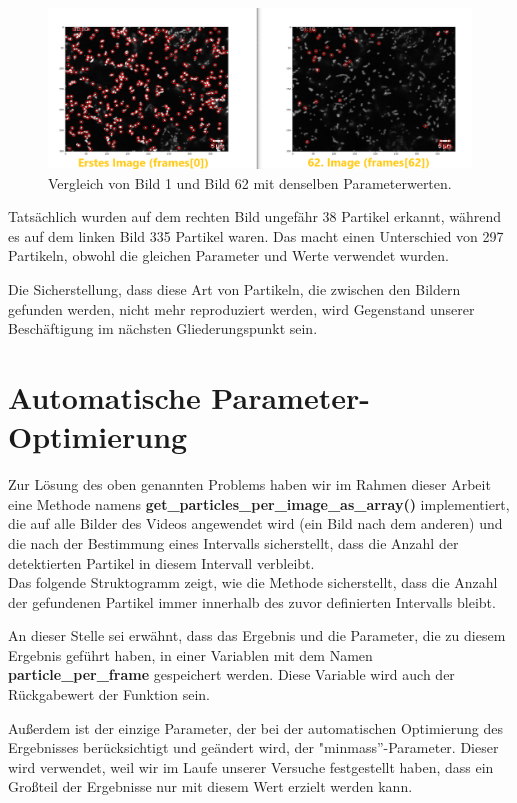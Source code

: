 \begin{figure}[H]
    \centering
    \includegraphics[scale=0.37]{Grafiken/trackpyBilder/comparison_0_Vs_62.png}
    \caption{Vergleich von Bild 1 und Bild 62 mit denselben Parameterwerten.}
    \label{fig:kap3_comp_Bild_1vs_62}
\end{figure}

Tatsächlich wurden auf dem rechten Bild ungefähr 38 Partikel erkannt, während es auf dem linken Bild 335 Partikel waren. Das macht einen Unterschied von 297 Partikeln, obwohl die gleichen Parameter und Werte verwendet wurden.

Die Sicherstellung, dass diese Art von Partikeln, die zwischen den Bildern gefunden werden, nicht mehr reproduziert werden, wird Gegenstand unserer Beschäftigung im nächsten Gliederungspunkt sein.

\section{Automatische Parameter-Optimierung}
Zur Lösung des oben genannten Problems haben wir im Rahmen dieser Arbeit eine Methode namens \textbf{get\_particles\_per\_image\_as\_array()} implementiert, die auf alle Bilder des Videos angewendet wird (ein Bild nach dem anderen) und die nach der Bestimmung eines Intervalls sicherstellt, dass die Anzahl der detektierten Partikel in diesem Intervall verbleibt.\\

Das folgende Struktogramm zeigt, wie die Methode sicherstellt, dass die Anzahl der gefundenen Partikel immer innerhalb des zuvor definierten Intervalls bleibt.

An dieser Stelle sei erwähnt, dass das Ergebnis und die Parameter, die zu diesem Ergebnis geführt haben, in einer Variablen mit dem Namen \textbf{particle\_per\_frame} gespeichert werden.  Diese Variable wird auch der Rückgabewert der Funktion sein. 

Außerdem ist der einzige Parameter, der bei der automatischen Optimierung des Ergebnisses berücksichtigt und geändert wird, der "minmass''-Parameter. Dieser wird verwendet, weil wir im Laufe unserer Versuche festgestellt haben, dass ein Großteil der Ergebnisse nur mit diesem Wert erzielt werden kann.

